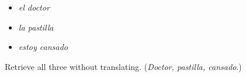 \begin{itemize}
\raggedright
  \item \emph{el doctor}
  \item \emph{la pastilla}
  \item \emph{estoy cansado}
\end{itemize}

\begin{tcolorbox}[breakable,colback=teal!4,colframe=teal!35!black,title={Before you move on}]
Retrieve all three without translating. (\emph{Doctor, pastilla, cansado}.)
\end{tcolorbox}
